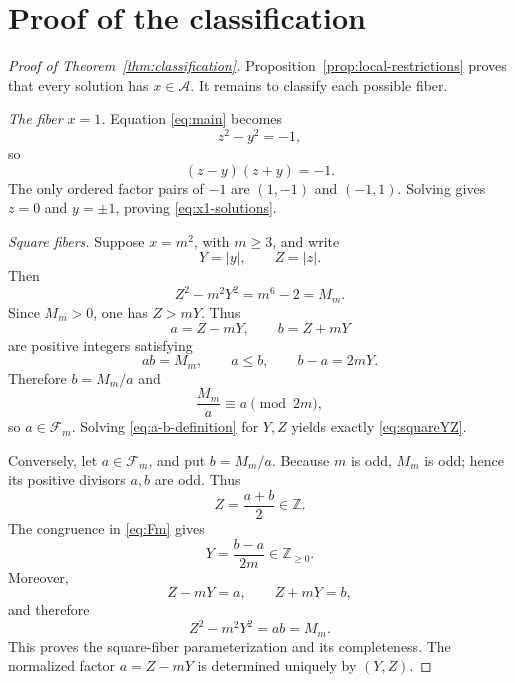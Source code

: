 \documentclass[11pt,a4paper]{amsart}
\theoremstyle{definition}
\newcommand{\Z}{\mathbb Z}
\newcommand{\Acal}{\mathcal A}
\newcommand{\Fcal}{\mathcal F}
\numberwithin{equation}{section}
\begin{document}
\section{Proof of the classification}

\begin{proof}[Proof of Theorem~\ref{thm:classification}]
Proposition~\ref{prop:local-restrictions} proves that every solution has
\(x\in\Acal\).  It remains to classify each possible fiber.

\smallskip
\noindent\emph{The fiber \(x=1\).}
Equation \eqref{eq:main} becomes
\begin{equation}
 z^2-y^2=-1,
\end{equation}
so
\begin{equation}
 (z-y)(z+y)=-1.
\end{equation}
The only ordered factor pairs of \(-1\) are \((1,-1)\) and \((-1,1)\).  Solving
gives \(z=0\) and \(y=\pm1\), proving \eqref{eq:x1-solutions}.

\smallskip
\noindent\emph{Square fibers.}
Suppose \(x=m^2\), with \(m\geq3\), and write
\begin{equation}
 Y=|y|,
 \qquad
 Z=|z|.
\end{equation}
Then
\begin{equation}
 Z^2-m^2Y^2=m^6-2=M_m.
 \label{eq:square-factor-equation}
\end{equation}
Since \(M_m>0\), one has \(Z>mY\).  Thus
\begin{equation}
 a=Z-mY,
 \qquad
 b=Z+mY
 \label{eq:a-b-definition}
\end{equation}
are positive integers satisfying
\begin{equation}
 ab=M_m,
 \qquad
 a\leq b,
 \qquad
 b-a=2mY.
 \label{eq:a-b-properties}
\end{equation}
Therefore \(b=M_m/a\) and
\begin{equation}
 \frac{M_m}{a}\equiv a\pmod{2m},
\end{equation}
so \(a\in\Fcal_m\).  Solving \eqref{eq:a-b-definition} for \(Y,Z\) yields exactly
\eqref{eq:squareYZ}.

Conversely, let \(a\in\Fcal_m\), and put \(b=M_m/a\).  Because \(m\) is odd,
\(M_m\) is odd; hence its positive divisors \(a,b\) are odd.  Thus
\begin{equation}
 Z=\frac{a+b}{2}\in\Z.
\end{equation}
The congruence in \eqref{eq:Fm} gives
\begin{equation}
 Y=\frac{b-a}{2m}\in\Z_{\geq0}.
\end{equation}
Moreover,
\begin{equation}
 Z-mY=a,
 \qquad
 Z+mY=b,
\end{equation}
and therefore
\begin{equation}
 Z^2-m^2Y^2=ab=M_m.
\end{equation}
This proves the square-fiber parameterization and its completeness.  The normalized
factor \(a=Z-mY\) is determined uniquely by \((Y,Z)\).


\end{proof}
\end{document}

